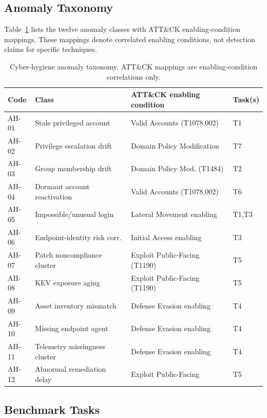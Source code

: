 \documentclass[conference]{IEEEtran}
\begin{document}
\subsection{Anomaly Taxonomy}

Table~\ref{tab:taxonomy} lists the twelve anomaly classes with ATT\&CK
enabling-condition mappings. These mappings denote correlated enabling conditions,
not detection claims for specific techniques.

\begin{table}[t]
\centering
\caption{Cyber-hygiene anomaly taxonomy. ATT\&CK mappings are enabling-condition
  correlations only.}
\label{tab:taxonomy}
\scriptsize
\begin{tabular}{@{}llll@{}}
\toprule
Code & Class & ATT\&CK enabling condition & Task(s) \\
\midrule
AH-01 & Stale privileged account       & Valid Accounts (T1078.002)    & T1 \\
AH-02 & Privilege escalation drift     & Domain Policy Modification    & T7 \\
AH-03 & Group membership drift         & Domain Policy Mod. (T1484)    & T2 \\
AH-04 & Dormant account reactivation   & Valid Accounts (T1078.002)    & T6 \\
AH-05 & Impossible/unusual login       & Lateral Movement enabling     & T1,T3 \\
AH-06 & Endpoint-identity risk corr.  & Initial Access enabling       & T3 \\
AH-07 & Patch noncompliance cluster    & Exploit Public-Facing (T1190) & T5 \\
AH-08 & KEV exposure aging             & Exploit Public-Facing (T1190) & T5 \\
AH-09 & Asset inventory mismatch       & Defense Evasion enabling      & T4 \\
AH-10 & Missing endpoint agent         & Defense Evasion enabling      & T4 \\
AH-11 & Telemetry missingness cluster  & Defense Evasion enabling      & T4 \\
AH-12 & Abnormal remediation delay     & Exploit Public-Facing         & T5 \\
\bottomrule
\end{tabular}
\end{table}

\subsection{Benchmark Tasks}
\end{document}
